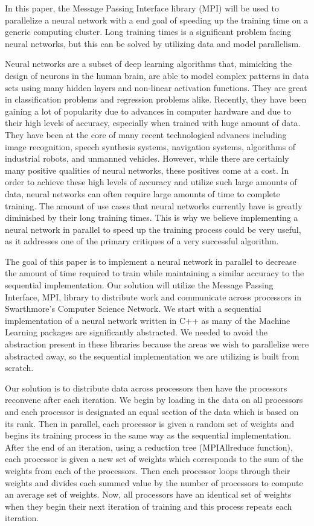 \documentclass[11pt,twocolumn]{article}
\begin{document}
In this paper, the Message Passing Interface library (MPI) will be used to parallelize a neural network with a end goal of speeding up the training time on a generic computing cluster. Long training times is a significant problem facing neural networks, but this can be solved by utilizing data and model parallelism.

Neural networks are a subset of deep learning algorithms that, mimicking the design of neurons in the human brain, are able to model complex patterns in data sets using many hidden layers and non-linear activation functions. They are great in classification problems and regression problems alike. Recently, they have been gaining a lot of popularity due to advances in computer hardware and due to their high levels of accuracy, especially when trained with huge amount of data. They have been at the core of many recent technological advances including image recognition, speech synthesis systems, navigation systems, algorithms of industrial robots, and unmanned vehicles. 
However, while there are certainly many positive qualities of neural networks, these positives come at a cost. In order to achieve these high levels of accuracy and utilize such large amounts of data, neural networks can often require large amounts of time to complete training. The amount of use cases that neural networks currently have is greatly diminished by their long training times. This is why we believe implementing a neural network in parallel to speed up the training process could be very useful, as it addresses one of the primary critiques of a very successful algorithm. 

The goal of this paper is to implement a neural network in parallel to decrease the amount of time required to train while maintaining a similar accuracy to the sequential implementation. Our solution will utilize the Message Passing Interface, MPI\cite{MPI}, library to distribute work and communicate across processors in Swarthmore's Computer Science Network. We start with a sequential implementation of a neural network written in C++ as many of the Machine Learning packages are significantly abstracted. We needed to avoid the abstraction present in these libraries because the areas we wish to parallelize were abstracted away, so the sequential implementation we are utilizing is built from scratch.

Our solution is to distribute data across processors then have the processors reconvene after each iteration. We begin by loading in the data on all processors and  each processor is designated an equal section of the data which is based on its rank. Then in parallel, each processor is given a random set of weights and begins its training process in the same way as the sequential implementation. After the end of an iteration, using a reduction tree (MPI\textunderscore Allreduce function), each processor is given a new set of weights which corresponds to the sum of the weights from each of the processors. Then each processor loops through their weights and divides each summed value by the number of processors to compute an average set of weights. Now, all processors have an identical set of weights when they begin their next iteration of training and this process repeats each iteration. 
\end{document}
